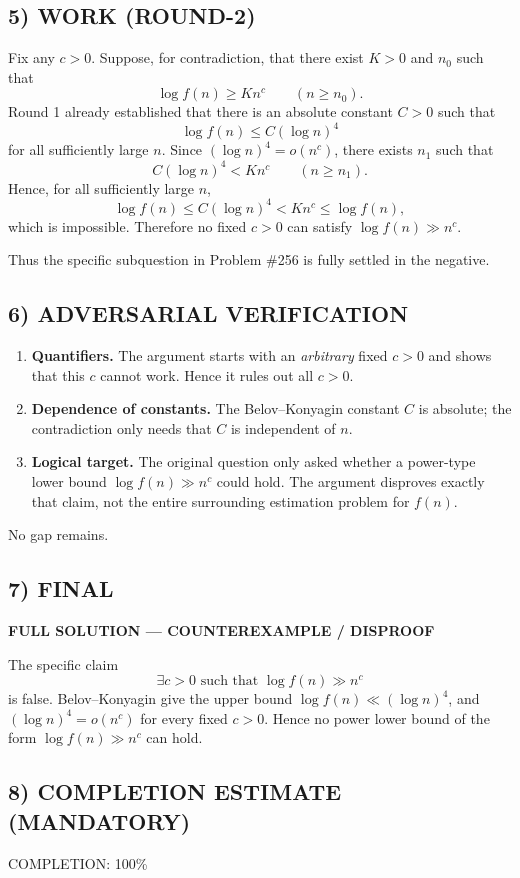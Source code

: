 \subsection*{5) WORK (ROUND-2)}
Fix any $c>0$. Suppose, for contradiction, that there exist $K>0$ and $n_0$ such that
\[
\log f(n)\ge K n^c\qquad (n\ge n_0).
\]
Round 1 already established that there is an absolute constant $C>0$ such that
\[
\log f(n)\le C(\log n)^4
\]
for all sufficiently large $n$. Since $(\log n)^4=o(n^c)$, there exists $n_1$ such that
\[
C(\log n)^4<K n^c\qquad (n\ge n_1).
\]
Hence, for all sufficiently large $n$,
\[
\log f(n)\le C(\log n)^4<K n^c\le \log f(n),
\]
which is impossible. Therefore no fixed $c>0$ can satisfy $\log f(n)\gg n^c$.

Thus the specific subquestion in Problem \#256 is fully settled in the negative.

\subsection*{6) ADVERSARIAL VERIFICATION}
\begin{enumerate}
\item \textbf{Quantifiers.} The argument starts with an \emph{arbitrary} fixed $c>0$ and shows that this $c$ cannot work. Hence it rules out all $c>0$.
\item \textbf{Dependence of constants.} The Belov--Konyagin constant $C$ is absolute; the contradiction only needs that $C$ is independent of $n$.
\item \textbf{Logical target.} The original question only asked whether a power-type lower bound $\log f(n)\gg n^c$ could hold. The argument disproves exactly that claim, not the entire surrounding estimation problem for $f(n)$.
\end{enumerate}
No gap remains.

\subsection*{7) FINAL}
\textbf{FULL SOLUTION --- COUNTEREXAMPLE / DISPROOF}

The specific claim
\[
\exists c>0\text{ such that }\log f(n)\gg n^c
\]
is false. Belov--Konyagin give the upper bound $\log f(n)\ll (\log n)^4$, and $(\log n)^4=o(n^c)$ for every fixed $c>0$. Hence no power lower bound of the form $\log f(n)\gg n^c$ can hold.

\subsection*{8) COMPLETION ESTIMATE (MANDATORY)}
COMPLETION: 100\%

